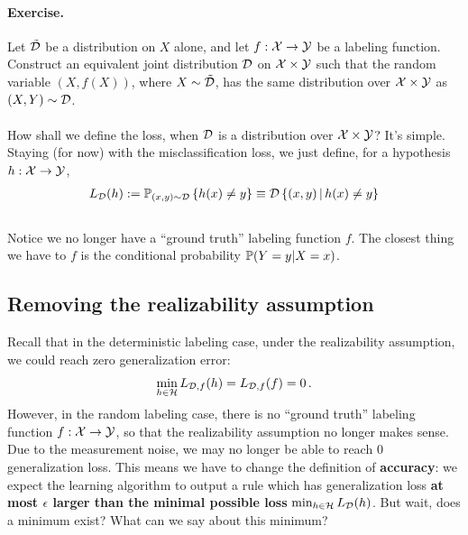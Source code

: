   
\paragraph{Exercise.} Let $\tilde{\mathcal{D}}$ be a distribution on $X$ alone, and let
$f:\mathcal{X}\to\mathcal{Y}$ be a labeling function. Construct an equivalent joint distribution
$\mathcal{D}$ on $\mathcal{X}\times\mathcal{Y}$ such that the random variable $(X,f(X))$, where
$X\sim\tilde{\mathcal{D}}$, has the same distribution over $\mathcal{X}\times\mathcal{Y}$ as $(X,Y)\sim\mathcal{D}$. 
%
\\~\\
How shall we define the loss, when $\mathcal{D}$ is a distribution over $\mathcal{X}\times \mathcal{Y}$?
It's simple. Staying (for now) with the misclassification loss, we just define,
for a hypothesis $h:\mathcal{X}\to\mathcal{Y}$,
    \begin{eqnarray} \label{L:def}
        L_{\mathcal{D}}(h) := \mathbb{P}_{(x,y)\sim\mathcal{D}}\left\{ h(x)\neq y \right\}
        \equiv \mathcal{D}\left\{ (x,y)\,|\, h(x)\neq y \right\}
    \end{eqnarray}
    ~\\
    Notice we no longer have a ``ground truth'' labeling function $f$. The
    closest thing we have to $f$  is the conditional probability
    $\operatorname*{\mathbb{P}}(Y=y|X=x)$.




\subsection{Removing the realizability assumption}

Recall that in the deterministic labeling case, under the realizability
assumption, we could reach zero generalization error:
\[
    \min_{h\in\mathcal{H}} L_{\mathcal{D},f}(h) = L_{\mathcal{D},f}(f)=0\,.
\]
However, in the random labeling case, there is no ``ground truth'' labeling function $f:\mathcal{X}\to\mathcal{Y}$, so
that the realizability assumption no longer makes sense. Due to the measurement
noise, we may no longer be able to reach $0$ generalization loss. This means we
have to change the definition of {\bf accuracy}: we expect the learning
algorithm to output a rule which has generalization loss {\bf at most $\epsilon$
larger than the
minimal possible loss} $\min_{h\in\mathcal{H}} L_{\mathcal{D}}(h)$. 
But wait, does a minimum exist? What can we say about this minimum?


